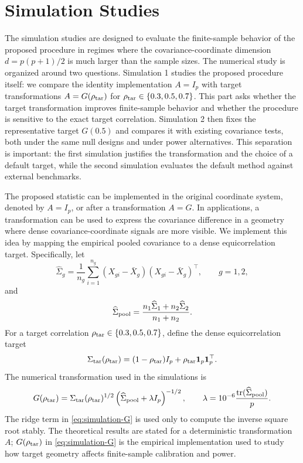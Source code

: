 \documentclass[
  12pt]{article}
\theoremstyle{plain}
\theoremstyle{definition}
\theoremstyle{remark}
\begin{document}
\section{Simulation Studies}\label{sec:simulation}
The simulation studies are designed to evaluate the finite-sample behavior of
the proposed procedure in regimes where the covariance-coordinate dimension
\(d=p(p+1)/2\) is much larger than the sample sizes.  The numerical study is
organized around two questions.  Simulation 1 studies the proposed procedure
itself: we compare the identity implementation \(A=I_p\) with target
transformations \(A=G(\rho_{\rm tar})\) for
\(\rho_{\rm tar}\in\{0.3,0.5,0.7\}\).  This part asks whether the target
transformation improves finite-sample behavior and whether the procedure is
sensitive to the exact target correlation.  Simulation 2 then fixes the
representative target \(G(0.5)\) and compares it with existing covariance tests,
both under the same null designs and under power alternatives.  This separation
is important: the first simulation justifies the transformation and the choice
of a default target, while the second simulation evaluates the default method
against external benchmarks.

The proposed statistic can be implemented in the original coordinate system,
denoted by \(A=I_p\), or after a transformation \(A=G\).  In applications, a
transformation can be used to express the covariance difference in a geometry
where dense covariance-coordinate signals are more visible.  We implement this
idea by mapping the empirical pooled covariance to a dense equicorrelation
target.  Specifically, let
\[
\widehat\Sigma_g
=
\frac1{n_g}\sum_{i=1}^{n_g}
(X_{gi}-\bar X_g)(X_{gi}-\bar X_g)^\top,
\qquad g=1,2,
\]
and
\[
\widehat\Sigma_{\rm pool}
=
\frac{n_1\widehat\Sigma_1+n_2\widehat\Sigma_2}{n_1+n_2}.
\]
For a target correlation \(\rho_{\rm tar}\in\{0.3,0.5,0.7\}\), define the
dense equicorrelation target
\begin{equation}
\label{eq:simulation-target}
\Sigma_{\rm tar}(\rho_{\rm tar})
=
(1-\rho_{\rm tar})I_p+\rho_{\rm tar}{\bf 1}_p{\bf 1}_p^\top.
\end{equation}
The numerical transformation used in the simulations is
\begin{equation}
\label{eq:simulation-G}
G(\rho_{\rm tar})
=
\Sigma_{\rm tar}(\rho_{\rm tar})^{1/2}
\left(\widehat\Sigma_{\rm pool}+\lambda I_p\right)^{-1/2},
\qquad
\lambda
=
10^{-6}\frac{\operatorname{tr}(\widehat\Sigma_{\rm pool})}{p}.
\end{equation}
The ridge term in \eqref{eq:simulation-G} is used only to compute the inverse
square root stably.  The theoretical results are stated for a deterministic
transformation \(A\); \(G(\rho_{\rm tar})\) in \eqref{eq:simulation-G} is the
empirical implementation used to study how target geometry affects finite-sample
calibration and power.
\end{document}
